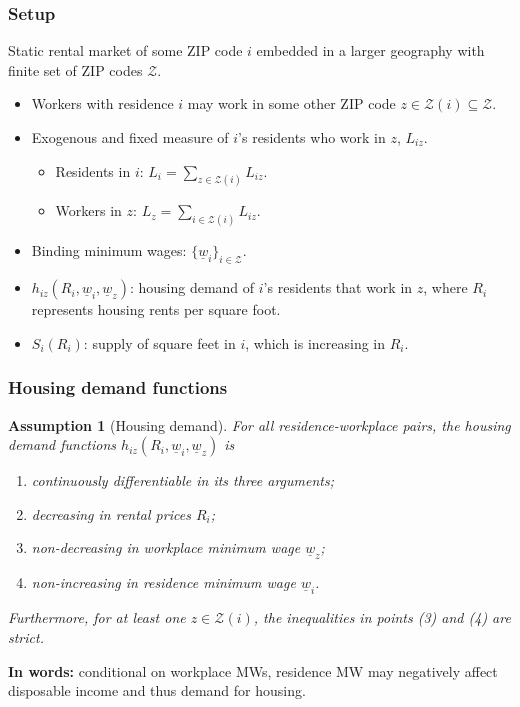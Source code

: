 \documentclass[aspectratio=169, t]{beamer}
\newtheorem{assu}{Assumption}
\newcommand{\Z}{\mathcal{Z}}
\newcommand{\MW}{\underline{w}}
\begin{document}
\begin{frame}
    \frametitle{Setup}
    
    Static rental market of some ZIP code $i$ embedded in a larger geography with finite
	set of ZIP codes $\Z$.    
    \begin{itemize}
		\vspace{2mm}
		\item Workers with residence $i$ may work in some other ZIP code $z\in\Z(i)\subseteq\Z$.

		\pause
		\vspace{2mm}
		\item Exogenous and fixed measure of $i$'s residents who work in $z$, $L_{iz}$.
		\begin{itemize}
			\item Residents in $i$: $L_i = \sum_{z \in \Z(i)} L_{iz}$.
			\item Workers in $z$: $L_z = \sum_{i \in \Z(i)} L_{iz}$.
		\end{itemize}
	
		\pause
		\vspace{2mm}
		\item Binding minimum wages: $\{\MW_i\}_{i\in\Z}$.
		
		\pause
		\vspace{2mm}
		\item $h_{i z} (R_i, \MW_i, \MW_z)$: housing demand of $i$'s residents that work in $z$, where $R_i$ 
		represents housing rents per square foot.

		\pause
		\vspace{2mm}
		\item $S_i \left(R_i \right)$: supply of square feet in $i$, which is increasing in $R_i$.

	\end{itemize}
\end{frame}

\begin{frame}
    \frametitle{Housing demand functions}
   
	\begin{assu}[Housing demand]\label{assu:housing_function}
		For all residence-workplace pairs, the housing demand functions $h_{iz} (R_i, \MW_i, \MW_z)$ is
		\begin{enumerate}
			\item continuously differentiable in its three arguments;
			\item decreasing in rental prices $R_i$;
			\item non-decreasing in workplace minimum wage $\MW_z$;
			\item non-increasing in residence minimum wage $\MW_i$.
		\end{enumerate}
		Furthermore, for at least one $z\in\Z(i)$, the inequalities in points (3)
		and (4) are strict.
	\end{assu}

	\pause 
	\vspace{2mm}

	\textbf{In words:} conditional on workplace MWs, residence MW may negatively affect disposable income
	and thus demand for housing.
\end{frame}
\end{document}
